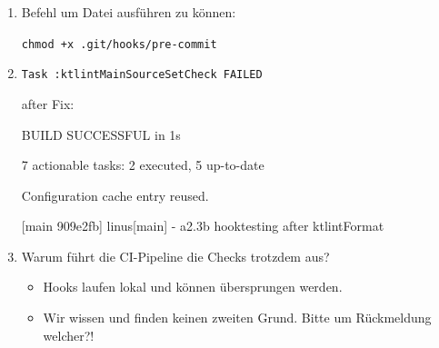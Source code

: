 \documentclass{article}
\begin{document}
\begin{enumerate}[label=\alph*)]
  \item %
  Befehl um Datei ausführen zu können:

  \texttt{chmod +x .git/hooks/pre-commit}

  \item %
  \texttt{Task :ktlintMainSourceSetCheck FAILED}

  after Fix:

  BUILD SUCCESSFUL in 1s

  7 actionable tasks: 2 executed, 5 up-to-date

  Configuration cache entry reused.

  [main 909e2fb] linus[main] - a2.3b hooktesting after ktlintFormat

  \item %
  Warum führt die CI-Pipeline die Checks trotzdem aus?

  \begin{itemize}
    \item   Hooks laufen lokal und können übersprungen werden.
    \item Wir wissen und finden keinen zweiten Grund. Bitte um Rückmeldung welcher?!
  \end{itemize}

\end{enumerate}
\end{document}
